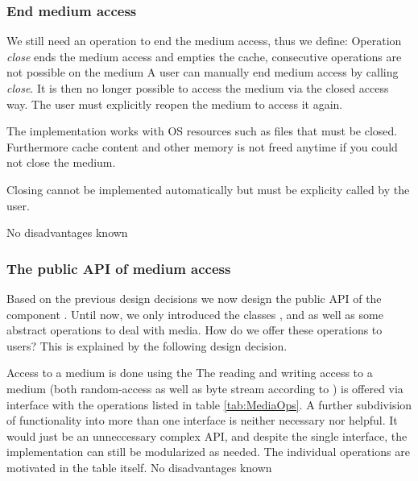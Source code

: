 
\subsubsection{End medium access}
\label{sec:ZugriffEinesTERMmediumBEEN}

We still need an operation to end the medium access, thus we define:
{%
Operation \emph{close} ends the medium access and empties the cache, consecutive operations are not possible on the medium
}
{%
A user can manually end medium access by calling \emph{close}. It is then no longer possible to access the medium via the closed access way. The user must explicitly reopen the medium to access it again.
}
{%
The implementation works with OS resources such as files that must be closed. Furthermore cache content and other memory is not freed anytime if you could not close the medium.

Closing cannot be implemented automatically but must be explicity called by the user.
}
{%
No disadvantages known
}


\subsubsection{The public API of medium access}
\label{sec:ZugriffEinesTERMmedium}

Based on the previous design decisions we now design the public API of the component \COMPmedia{}. Until now, we only introduced the classes \IMediumReference{}, \IMedium{} and \MediumAction{} as well as some abstract operations to deal with media. How do we offer these operations to users? This is explained by the following design decision.

{%
Access to a medium is done using the \IMediumStore{} 
}
{%
The reading and writing access to a medium (both random-access as well as byte stream according to ) is offered via interface \IMediumStore{} with the operations listed in table \hyperref[tab:MediaOps]{\ref{tab:MediaOps}}.
}
{%
A further subdivision of functionality into more than one interface is neither necessary nor helpful. It would just be an unneccessary complex API, and despite the single interface, the implementation can still be modularized as needed. The individual operations are motivated in the table itself.
}
{%
No disadvantages known
}

